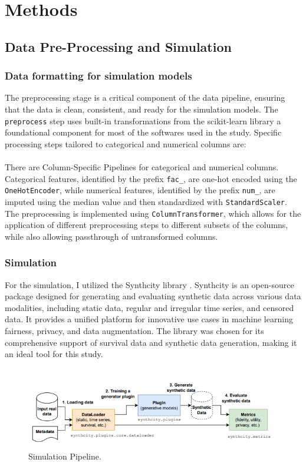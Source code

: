 \section{Methods} \label{methods}
\subsection{Data Pre-Processing and Simulation}
\subsubsection*{Data formatting for simulation models}

\noindent The preprocessing stage is a critical component of the data pipeline, ensuring that the data is clean, consistent, and ready for the simulation models. The \texttt{preprocess} step uses built-in transformations from the scikit-learn library a foundational component for most of the softwares used in the study. Specific processing steps tailored to categorical and numerical columns are:
\\\\
\noindent There are Column-Specific Pipelines for categorical and numerical columns. Categorical features, identified by the prefix \texttt{fac\_}, are one-hot encoded using the \texttt{OneHotEncoder}, while numerical features, identified by the prefix \texttt{num\_}, are imputed using the median value and then standardized with \texttt{StandardScaler}. The preprocessing is implemented using \texttt{ColumnTransformer}, which allows for the application of different preprocessing steps to different subsets of the columns, while also allowing passthrough of untransformed columns.

\subsubsection*{Simulation}
For the simulation, I utilized the Synthcity library \parencite{qian_synthcity_2023}. Synthcity is an open-source package designed for generating and evaluating synthetic data across various data modalities, including static data, regular and irregular time series, and censored data. It provides a unified platform for innovative use cases in machine learning fairness, privacy, and data augmentation. The library was chosen for its comprehensive support of survival data and synthetic data generation, making it an ideal tool for this study.
\begin{figure}[h]
    \centering
    \includegraphics[width=\linewidth]{Figures/SynthCity.png}
    \caption{\parencite{qian_synthcity_2023} Simulation Pipeline.}
\end{figure}

